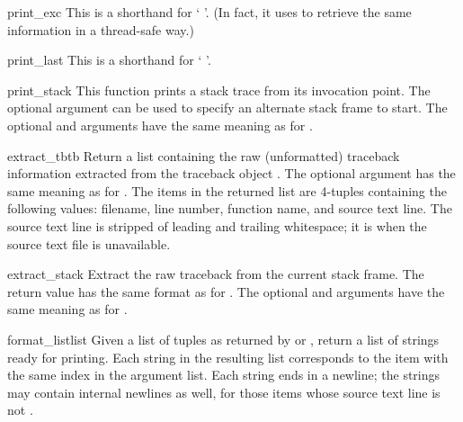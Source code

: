 \begin{funcdesc}{print_exc}{}
This is a shorthand for `
  \code{,}
\code{)}'.  (In fact, it uses  to
retrieve the same information in a thread-safe way.)
\end{funcdesc}

\begin{funcdesc}{print_last}{}
This is a shorthand for `
  \code{,}
\code{)}'.
\end{funcdesc}

\begin{funcdesc}{print_stack}{}
This function prints a stack trace from its invocation point.  The
optional  argument can be used to specify an alternate stack
frame to start.  The optional  and  arguments have the
same meaning as for .
\end{funcdesc}

\begin{funcdesc}{extract_tb}{tb}
Return a list containing the raw (unformatted) traceback information
extracted from the traceback object .  The optional
 argument has the same meaning as for
.  The items in the returned list are
4-tuples containing the following values: filename, line number,
function name, and source text line.  The source text line is stripped 
of leading and trailing whitespace; it is  when the source
text file is unavailable.
\end{funcdesc}

\begin{funcdesc}{extract_stack}{}
Extract the raw traceback from the current stack frame.  The return
value has the same format as for .  The
optional  and  arguments have the same meaning as
for .
\end{funcdesc}

\begin{funcdesc}{format_list}{list}
Given a list of tuples as returned by  or
, return a list of strings ready for
printing.  Each string in the resulting list corresponds to the item
with the same index in the argument list.  Each string ends in a
newline; the strings may contain internal newlines as well, for those
items whose source text line is not .
\end{funcdesc}

